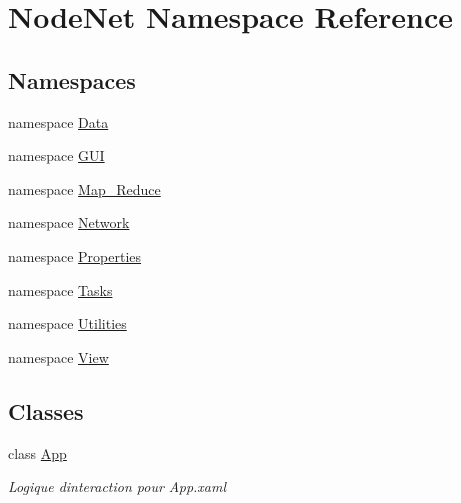 \hypertarget{namespace_node_net}{}\section{Node\+Net Namespace Reference}
\label{namespace_node_net}
\subsection*{Namespaces}
\begin{DoxyCompactItemize}
\item 
namespace \hyperlink{namespace_node_net_1_1_data}{Data}
\item 
namespace \hyperlink{namespace_node_net_1_1_g_u_i}{G\+UI}
\item 
namespace \hyperlink{namespace_node_net_1_1_map___reduce}{Map\+\_\+\+Reduce}
\item 
namespace \hyperlink{namespace_node_net_1_1_network}{Network}
\item 
namespace \hyperlink{namespace_node_net_1_1_properties}{Properties}
\item 
namespace \hyperlink{namespace_node_net_1_1_tasks}{Tasks}
\item 
namespace \hyperlink{namespace_node_net_1_1_utilities}{Utilities}
\item 
namespace \hyperlink{namespace_node_net_1_1_view}{View}
\end{DoxyCompactItemize}
\subsection*{Classes}
\begin{DoxyCompactItemize}
\item 
class \hyperlink{class_node_net_1_1_app}{App}
\begin{DoxyCompactList}\small\item\em Logique d\textquotesingle{}interaction pour App.\+xaml \end{DoxyCompactList}\end{DoxyCompactItemize}
